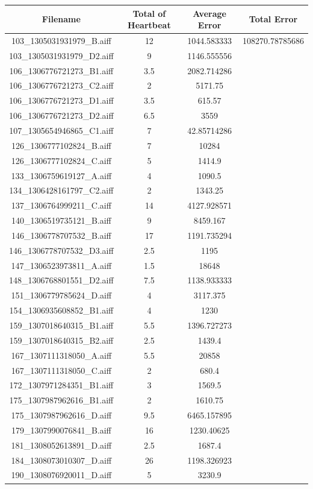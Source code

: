 \documentclass{article}
\begin{document}
\begin{enumerate}
\begin{center}
\begin{tabular}{|c|c|c|c|}
\hline
Filename&Total of Heartbeat&Average Error&Total Error\\ 
\hline
103\_1305031931979\_B.aiff&12&1044.583333&108270.78785686\\ 
103\_1305031931979\_D2.aiff&9&1146.555556&\\ 
106\_1306776721273\_B1.aiff&3.5&2082.714286&\\ 
106\_1306776721273\_C2.aiff&2&5171.75&\\ 
106\_1306776721273\_D1.aiff&3.5&615.57&\\ 
106\_1306776721273\_D2.aiff&6.5&3559&\\ 
107\_1305654946865\_C1.aiff&7&42.85714286&\\ 
126\_1306777102824\_B.aiff&7&10284&\\ 
126\_1306777102824\_C.aiff&5&1414.9&\\ 
133\_1306759619127\_A.aiff&4&1090.5&\\ 
134\_1306428161797\_C2.aiff&2&1343.25&\\ 
137\_1306764999211\_C.aiff&14&4127.928571&\\ 
140\_1306519735121\_B.aiff&9&8459.167&\\ 
146\_1306778707532\_B.aiff&17&1191.735294&\\ 
146\_1306778707532\_D3.aiff&2.5&1195&\\ 
147\_1306523973811\_A.aiff&1.5&18648&\\ 
148\_1306768801551\_D2.aiff&7.5&1138.933333&\\ 
151\_1306779785624\_D.aiff&4&3117.375&\\ 
154\_1306935608852\_B1.aiff&4&1230&\\ 
159\_1307018640315\_B1.aiff&5.5&1396.727273&\\ 
159\_1307018640315\_B2.aiff&2.5&1439.4&\\ 
167\_1307111318050\_A.aiff&5.5&20858&\\ 
167\_1307111318050\_C.aiff&2&680.4&\\ 
172\_1307971284351\_B1.aiff&3&1569.5&\\ 
175\_1307987962616\_B1.aiff&2&1610.75&\\ 
175\_1307987962616\_D.aiff&9.5&6465.157895&\\ 
179\_1307990076841\_B.aiff&16&1230.40625&\\ 
181\_1308052613891\_D.aiff&2.5&1687.4&\\ 
184\_1308073010307\_D.aiff&26&1198.326923&\\ 
190\_1308076920011\_D.aiff&5&3230.9&\\ 


\hline
\end{tabular}
\end{center}
\end{enumerate}
\end{document}
